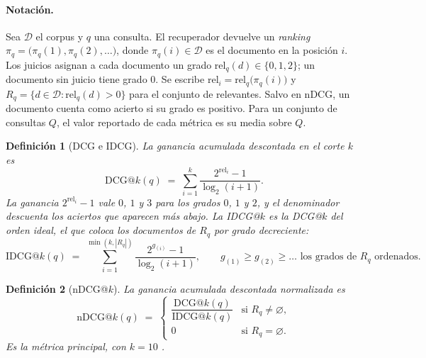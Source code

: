 \documentclass[11pt,letterpaper]{article}
\newtheorem{definition}{Definición}[section]
\numberwithin{equation}{section}
\begin{document}
\paragraph{Notación.} Sea $\mathcal{D}$ el corpus y $q$ una consulta. El recuperador devuelve un \emph{ranking} $\pi_q=\big(\pi_q(1),\allowbreak\pi_q(2),\allowbreak\dots\big)$, donde $\pi_q(i)\in\mathcal{D}$ es el documento en la posición $i$. Los juicios asignan a cada documento un grado $\mathrm{rel}_q(d)\in\{0,1,2\}$; un documento sin juicio tiene grado $0$. Se escribe $\mathrm{rel}_i=\mathrm{rel}_q\big(\pi_q(i)\big)$ y $R_q=\{d\in\mathcal{D}:\mathrm{rel}_q(d)>0\}$ para el conjunto de relevantes. Salvo en nDCG, un documento cuenta como acierto si su grado es positivo. Para un conjunto de consultas $Q$, el valor reportado de cada métrica es su media sobre $Q$.

\begin{definition}[DCG e IDCG]
\label{def:dcg}
La ganancia acumulada descontada en el corte $k$ es
\begin{equation}
\mathrm{DCG@}k(q) \;=\; \sum_{i=1}^{k} \frac{2^{\mathrm{rel}_i}-1}{\log_2(i+1)} .
\label{eq:g-dcg}
\end{equation}
La ganancia $2^{\mathrm{rel}_i}-1$ vale $0$, $1$ y $3$ para los grados $0$, $1$ y $2$, y el denominador descuenta los aciertos que aparecen más abajo. La IDCG@$k$ es la DCG@$k$ del orden ideal, el que coloca los documentos de $R_q$ por grado decreciente:
\begin{equation}
\mathrm{IDCG@}k(q) \;=\; \sum_{i=1}^{\min(k,|R_q|)} \frac{2^{g_{(i)}}-1}{\log_2(i+1)},
\qquad g_{(1)}\geq g_{(2)}\geq\dots \text{ los grados de } R_q \text{ ordenados.}
\label{eq:g-idcg}
\end{equation}
\end{definition}

\begin{definition}[nDCG@$k$]
\label{def:ndcg}
La ganancia acumulada descontada normalizada es
\begin{equation}
\mathrm{nDCG@}k(q) \;=\;
\begin{cases}
\dfrac{\mathrm{DCG@}k(q)}{\mathrm{IDCG@}k(q)} & \text{si } R_q\neq\varnothing,\\[2mm]
0 & \text{si } R_q=\varnothing .
\end{cases}
\label{eq:g-ndcg}
\end{equation}
Es la métrica principal, con $k=10$ \cite{jarvelin2002ndcg}.
\end{definition}
\end{document}
